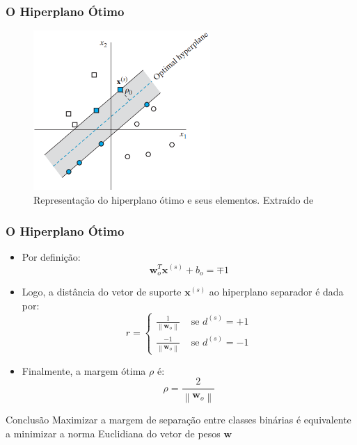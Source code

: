 \documentclass{beamer}
\begin{document}
\begin{frame}
	\frametitle{O Hiperplano Ótimo}
	\begin{figure}[h!]
		\centering
		\includegraphics[width=0.6\textwidth]{fig03.png}
		\caption{Representação do hiperplano ótimo e seus elementos. Extraído de \cite{haykin}}
		\label{fig:haykin-01}
	\end{figure}
\end{frame}


\begin{frame}
	\frametitle{O Hiperplano Ótimo}
	
	\begin{itemize}
		\item Por definição:
		\begin{equation}
			\textbf{w}^T_o\textbf{x}^{(s)} + b_o = \mp 1
			\label{eq:support-vectors}
		\end{equation}	
		\item Logo, a distância do vetor de suporte $\textbf{x}^{(s)}$ ao hiperplano separador é dada por:
		\begin{equation}
		r = \begin{cases}
			\frac{1}{\left \| \textbf{w}_o \right \|} & \text{ se } d^{(s)}= +1\\ 
			\frac{-1}{\left \| \textbf{w}_o \right \|}& \text{ se } d^{(s)}= -1 
		\end{cases}
		\end{equation}
		\item Finalmente, a margem ótima $\rho$ é:
		\begin{equation}
			\rho = \frac{2}{\left \| \textbf{w}_o \right \|}
			\label{eq:margin-opt}
		\end{equation}
	\end{itemize}	
	
	\begin{block}{Conclusão}
		Maximizar a margem de separação entre classes binárias é equivalente a minimizar a norma Euclidiana do vetor de pesos $\textbf{w}$
	\end{block}

\end{frame}
\end{document}
